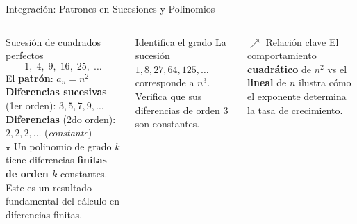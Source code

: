 \documentclass[12pt, aspectratio=169]{beamer}
\begin{document}
\begin{frame}{Integración: Patrones en Sucesiones y Polinomios}
  \begin{columns}[T]
    \begin{block}{Sucesión de cuadrados perfectos}
      \small
      \[
        1,\; 4,\; 9,\; 16,\; 25,\; \ldots
      \]
      El \textbf{patrón}: $a_n = n^2$\\[4pt]
      \textbf{Diferencias sucesivas} (1er orden): $3, 5, 7, 9, \ldots$\\
      \textbf{Diferencias} (2do orden): $2, 2, 2, \ldots$ (\emph{constante})\\[4pt]
      $\star$\; Un polinomio de grado $k$ tiene diferencias \textbf{finitas de orden $k$} constantes. Este es un resultado fundamental del cálculo en diferencias finitas.
    \end{block}
    \vspace{6pt}
    \begin{ejercicio}{Identifica el grado}
      \small La sucesión $1, 8, 27, 64, 125, \ldots$ corresponde a $n^3$. Verifica que sus diferencias de orden 3 son constantes.
    \end{ejercicio}

    \vspace{4pt}
    \begin{block}{$\nearrow$\; Relación clave}
      \small El comportamiento \textbf{cuadrático} de $n^2$ vs el \textbf{lineal} de $n$ ilustra cómo el exponente determina la tasa de crecimiento.
    \end{block}
  \end{columns}
\end{frame}
\end{document}
